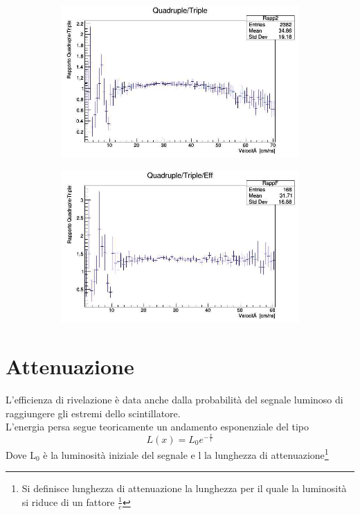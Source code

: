 \documentclass[a4paper]{article}
\begin{document}
\begin{figure}[H]
\begin{subfigure}[b]{0.4\textwidth}
\includegraphics[width=\textwidth]{./immagini/TimeOfFlight/RappPiomboFore.jpg}
\caption{}
\label{fig:RappPbFore}
\end{subfigure}
\hfill
\begin{subfigure}[b]{0.4\textwidth}
\includegraphics[width=\textwidth]{./immagini/TimeOfFlight/RappPbEffFore.jpg}
\caption{}
\label{fig:RappPbEffFore}
\end{subfigure}
\caption{}
\end{figure}

\section{Attenuazione}
\label{sec:Atte}
L'efficienza di rivelazione è data anche dalla probabilità del segnale luminoso di raggiungere gli estremi dello scintillatore.\\
L'energia persa segue teoricamente un andamento esponenziale del tipo
\begin{equation}
L(x) = L_0e^{-\frac{x}{l}}
\label{eq:AttLuce}
\end{equation}
Dove L$_0$ è la luminosità iniziale del segnale e l la lunghezza di attenuazione\footnote{Si definisce lunghezza di attenuazione la lunghezza per il quale la luminosità si riduce di un fattore $\frac{1}{e}$}
\end{document}
